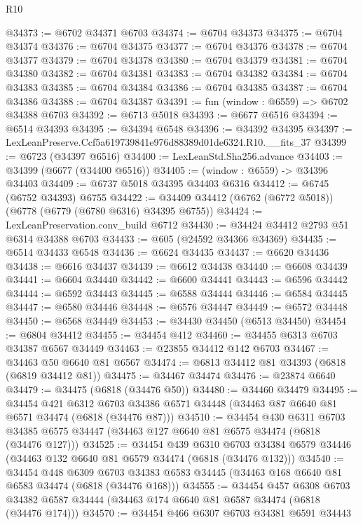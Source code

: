 \begin{lexlean}{R10}
\begin{coremodule}
@34373 := @6702 @34371 @6703
@34374 := @6704 @34373
@34375 := @6704 @34374
@34376 := @6704 @34375
@34377 := @6704 @34376
@34378 := @6704 @34377
@34379 := @6704 @34378
@34380 := @6704 @34379
@34381 := @6704 @34380
@34382 := @6704 @34381
@34383 := @6704 @34382
@34384 := @6704 @34383
@34385 := @6704 @34384
@34386 := @6704 @34385
@34387 := @6704 @34386
@34388 := @6704 @34387
@34391 := fun (window : @6559) => @6702 @34388 @6703
@34392 := @6713 @5018
@34393 := @6677 @6516
@34394 := @6514 @34393
@34395 := @34394 @6548
@34396 := @34392 @34395
@34397 := LexLeanPreserve.Ccf5a619739841e976d88389d01de6324.R10.__fits_37
@34399 := @6723 (@34397 @6516)
@34400 := LexLeanStd.Sha256.advance
@34403 := @34399 (@6677 (@34400 @6516))
@34405 := (window : @6559) -> @34396 @34403
@34409 := @6737 @5018 @34395 @34403 @6316
@34412 := @6745 (@6752 @34393) @6755
@34422 := @34409 @34412 (@6762 (@6772 @5018)) (@6778 (@6779 (@6780 @6316) @34395 @6755))
@34424 := LexLeanPreservation.conv_build @6712
@34430 := @34424 @34412 @2793 @51 @6314 @34388 @6703
@34433 := @605 (@24592 @34366 @34369)
@34435 := @6514 @34433 @6548
@34436 := @6624 @34435
@34437 := @6620 @34436
@34438 := @6616 @34437
@34439 := @6612 @34438
@34440 := @6608 @34439
@34441 := @6604 @34440
@34442 := @6600 @34441
@34443 := @6596 @34442
@34444 := @6592 @34443
@34445 := @6588 @34444
@34446 := @6584 @34445
@34447 := @6580 @34446
@34448 := @6576 @34447
@34449 := @6572 @34448
@34450 := @6568 @34449
@34453 := @34430 @34450 (@6513 @34450)
@34454 := @6804 @34412
@34455 := @34454 @412
@34460 := @34455 @6313 @6703 @34387 @6567 @34449
@34463 := @23855 @34412 @142 @6703
@34467 := @34463 @50 @6640 @81 @6567
@34474 := @6813 @34412 @81 @34393 (@6818 (@6819 @34412 @81))
@34475 := @34467 @34474
@34476 := @23874 @6640
@34479 := @34475 (@6818 (@34476 @50))
@34480 := @34460 @34479
@34495 := @34454
    @421
    @6312
    @6703
    @34386
    @6571
    @34448
    (@34463 @87 @6640 @81 @6571 @34474 (@6818 (@34476 @87)))
@34510 := @34454
    @430
    @6311
    @6703
    @34385
    @6575
    @34447
    (@34463 @127 @6640 @81 @6575 @34474 (@6818 (@34476 @127)))
@34525 := @34454
    @439
    @6310
    @6703
    @34384
    @6579
    @34446
    (@34463 @132 @6640 @81 @6579 @34474 (@6818 (@34476 @132)))
@34540 := @34454
    @448
    @6309
    @6703
    @34383
    @6583
    @34445
    (@34463 @168 @6640 @81 @6583 @34474 (@6818 (@34476 @168)))
@34555 := @34454
    @457
    @6308
    @6703
    @34382
    @6587
    @34444
    (@34463 @174 @6640 @81 @6587 @34474 (@6818 (@34476 @174)))
@34570 := @34454
    @466
    @6307
    @6703
    @34381
    @6591
    @34443

\end{coremodule}
\end{lexlean}
